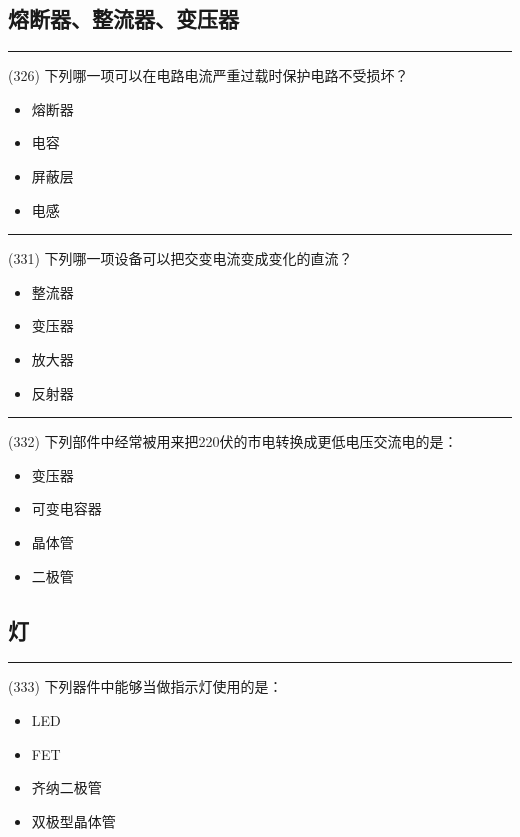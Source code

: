 \documentclass[twocolumn,hyperref,UTF8]{ctexart}  %
\begin{document}
\clearpage
\subsection{熔断器、整流器、变压器}


\noindent\rule{0.5\textwidth}{1pt}
\heiti (326) 下列哪一项可以在电路电流严重过载时保护电路不受损坏？ \songti {\color{gray} [LK1151] }
\begin{itemize}
	\item  熔断器
	\item  电容
	\item  屏蔽层
	\item  电感
\end{itemize}


\noindent\rule{0.5\textwidth}{1pt}
\heiti (331) 下列哪一项设备可以把交变电流变成变化的直流？ \songti {\color{gray} [LK1167] }
\begin{itemize}
	\item  整流器
	\item  变压器
	\item  放大器
	\item  反射器
\end{itemize}


\noindent\rule{0.5\textwidth}{1pt}
\heiti (332) 下列部件中经常被用来把220伏的市电转换成更低电压交流电的是： \songti {\color{gray} [LK1169] }
\begin{itemize}
	\item  变压器
	\item  可变电容器
	\item  晶体管
	\item  二极管
\end{itemize}


\clearpage
\subsection{灯}


\noindent\rule{0.5\textwidth}{1pt}
\heiti (333) 下列器件中能够当做指示灯使用的是： \songti {\color{gray} [LK1170] }
\begin{itemize}
	\item  LED
	\item  FET
	\item  齐纳二极管
	\item  双极型晶体管
\end{itemize}
\end{document}
